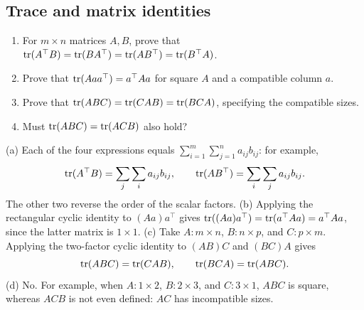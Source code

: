 \subsection*{Trace and matrix identities}
\begin{problem}\label{ex:02:cyclic-trace}
\begin{enumerate}
\item For $m\times n$ matrices $A,B$, prove that
$\operatorname{tr}(A^\top B)=\operatorname{tr}(BA^\top)=\operatorname{tr}(AB^\top)=\operatorname{tr}(B^\top A)$.
\item Prove that $\operatorname{tr}(Aaa^\top)=a^\top Aa$ for square $A$ and a compatible column $a$.
\item Prove that $\operatorname{tr}(ABC)=\operatorname{tr}(CAB)=\operatorname{tr}(BCA)$, specifying the compatible sizes.
\item Must $\operatorname{tr}(ABC)=\operatorname{tr}(ACB)$ also hold?
\end{enumerate}
\end{problem}
\begin{solution}
(a) Each of the four expressions equals $\sum_{i=1}^m\sum_{j=1}^n a_{ij}b_{ij}$:
for example,
\[
\operatorname{tr}(A^\top B)=\sum_j\sum_i a_{ij}b_{ij},
\qquad \operatorname{tr}(AB^\top)=\sum_i\sum_j a_{ij}b_{ij}.
\]
The other two reverse the order of the scalar factors.
(b) Applying the rectangular cyclic identity to $(Aa)a^\top$ gives
$\operatorname{tr}((Aa)a^\top)=\operatorname{tr}(a^\top Aa)=a^\top Aa$, since the latter matrix is $1\times1$.
(c) Take $A:m\times n$, $B:n\times p$, and $C:p\times m$.
Applying the two-factor cyclic identity to $(AB)C$ and $(BC)A$ gives
\[
\operatorname{tr}(ABC)=\operatorname{tr}(CAB),\qquad \operatorname{tr}(BCA)=\operatorname{tr}(ABC).
\]
(d) No. For example, when $A:1\times2$, $B:2\times3$, and $C:3\times1$,
$ABC$ is square, whereas $ACB$ is not even defined: $AC$ has incompatible sizes.
\end{solution}

